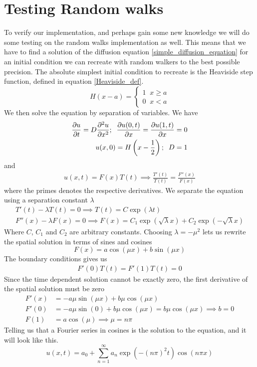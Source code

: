 \section{Testing Random walks}\label{testing_random_walks}

To verify our implementation, and perhaps gain some new knowledge we will do some testing on the random walks implementation as well. 
This means that we have to find a solution of the diffusion equation \ref{simple_diffusion_equation} for an initial condition we can recreate with random walkers to the best possible precision. 
The absolute simplest initial condition to recreate is the Heaviside step function, defined in equation \ref{Heaviside_def}. 
\begin{equation}\label{Heaviside_def}
 H(x-a) = \begin{cases}
           1\;\;x\geq a\\
           0\;\;x<a
          \end{cases}
\end{equation}
We then solve the equation by separation of variables. We have
\begin{align*}
 \frac{\partial u}{\partial t} = D\frac{\partial^2 u}{\partial x^2};\;\; \frac{\partial u(0,t)}{\partial x} = \frac{\partial u(1,t)}{\partial x} = 0 \\
 u(x,0) = H\left(x-\frac{1}{2}\right);\;\; D = 1
\end{align*}
and
\begin{align*}
 u(x,t) = F(x)T(t) \implies \frac{T'(t)}{T(t)} = \frac{F''(x)}{F(x)}
\end{align*}
where the primes denotes the respective derivatives. We separate the equation using a separation constant $\lambda$
\begin{align*}
 T'(t)-\lambda T(t) = 0 \implies T(t) = C\exp(\lambda t)\\
 F''(x) -\lambda F(x) = 0 \implies F(x) = C_1\exp(\sqrt{\lambda}x) + C_2\exp(-\sqrt{\lambda}x)
\end{align*}
Where $C$, $C_1$ and $C_2$ are arbitrary constants. 
Choosing $\lambda = -\mu^2$ lets us rewrite the spatial solution in terms of sines and cosines
\begin{equation*}
 F(x) = a\cos(\mu x) + b\sin(\mu x)
\end{equation*}
The boundary conditions gives us 
\begin{align*}
 F'(0)T(t) = F'(1)T(t) = 0
\end{align*}
Since the time dependent solution cannot be exactly zero, the first derivative of the spatial solution must be zero
\begin{align*}
 F'(x) &= -a\mu\sin(\mu x) + b\mu\cos(\mu x) \\
 F'(0) &= -a \mu\sin(0) + b\mu\cos(\mu x) = b\mu\cos(\mu x) \implies b=0 \\
 F(1) &= a\cos(\mu) \implies \mu = n\pi
\end{align*}
Telling us that a Fourier series in cosines is the solution to the equation, and it will look like this.
\begin{equation}
 u(x,t) = a_0 + \sum\limits_{n=1}^\infty a_n\exp\left(-(n\pi)^2t\right)\cos(n\pi x)
\end{equation}

